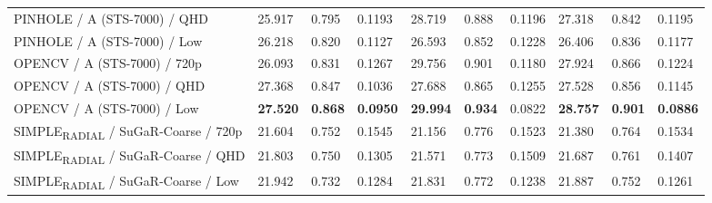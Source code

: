 \documentclass[a4paper,landscape]{article}
\begin{document}
\begin{center}
\begin{tabularx}{0.99\linewidth}{>{\raggedright\arraybackslash}p{5.0cm}YYYYYYYYY}
PINHOLE / A (STS-7000) / QHD & 25.917 & 0.795 & 0.1193 & 28.719 & 0.888 & 0.1196 & 27.318 & 0.842 & 0.1195 \\
PINHOLE / A (STS-7000) / Low & 26.218 & 0.820 & 0.1127 & 26.593 & 0.852 & 0.1228 & 26.406 & 0.836 & 0.1177 \\
OPENCV / A (STS-7000) / 720p & 26.093 & 0.831 & 0.1267 & 29.756 & 0.901 & 0.1180 & 27.924 & 0.866 & 0.1224 \\
OPENCV / A (STS-7000) / QHD & 27.368 & 0.847 & 0.1036 & 27.688 & 0.865 & 0.1255 & 27.528 & 0.856 & 0.1145 \\
OPENCV / A (STS-7000) / Low & \textbf{27.520} & \textbf{0.868} & \textbf{0.0950} & \textbf{29.994} & \textbf{0.934} & 0.0822 & \textbf{28.757} & \textbf{0.901} & \textbf{0.0886} \\
SIMPLE\textsubscript{RADIAL} / SuGaR-Coarse / 720p & 21.604 & 0.752 & 0.1545 & 21.156 & 0.776 & 0.1523 & 21.380 & 0.764 & 0.1534 \\
SIMPLE\textsubscript{RADIAL} / SuGaR-Coarse / QHD & 21.803 & 0.750 & 0.1305 & 21.571 & 0.773 & 0.1509 & 21.687 & 0.761 & 0.1407 \\
SIMPLE\textsubscript{RADIAL} / SuGaR-Coarse / Low & 21.942 & 0.732 & 0.1284 & 21.831 & 0.772 & 0.1238 & 21.887 & 0.752 & 0.1261 \\

\end{tabularx}
\end{center}
\end{document}
